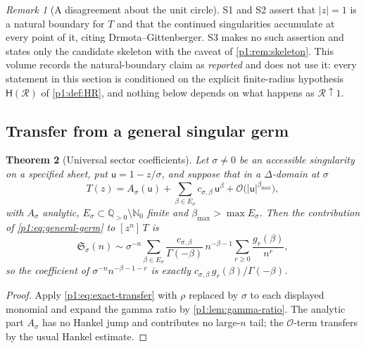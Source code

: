 \documentclass[11pt,a4paper,oneside]{book}
\theoremstyle{plain}
\newtheorem{theorem}{Theorem}[chapter]
\theoremstyle{definition}
\theoremstyle{remark}
\newtheorem{remark}[theorem]{Remark}
\newcommand{\Nat}{\mathbb{N}}
\newcommand{\Rat}{\mathbb{Q}}
\newcommand{\Coef}[1]{[#1]\,}
\newcommand{\bigO}{\mathcal{O}}
\begin{document}
\begin{remark}[A disagreement about the unit circle]
\label{p1:rem:natural-boundary}
\textsf{S1} and \textsf{S2} assert that $|z|=1$ is a natural boundary for $T$ and that the
continued singularities accumulate at every point of it, citing Drmota--Gittenberger.
\textsf{S3} makes no such assertion and states only the candidate skeleton with the caveat of
\cref{p1:rem:skeleton}.  This volume records the natural-boundary claim as \emph{reported} and
does not use it: every statement in this section is conditioned on the explicit finite-radius
hypothesis $\mathsf H(\mathcal R)$ of \cref{p1:def:HR}, and nothing below depends on what
happens as $\mathcal R\uparrow1$.
\end{remark}

\subsection{Transfer from a general singular germ}

\begin{theorem}[Universal sector coefficients]
\label{p1:thm:general-sector}
Let $\sigma\ne0$ be an accessible singularity on a specified sheet, put $\mathsf
u=1-z/\sigma$, and suppose that in a $\Delta$-domain at $\sigma$
\begin{equation}
 T(z)=A_\sigma(\mathsf u)
 +\sum_{\beta\in E_\sigma}c_{\sigma,\beta}\,\mathsf u^{\beta}
 +\bigO\bigl(|\mathsf u|^{\beta_{\max}}\bigr),
 \label{p1:eq:general-germ}
\end{equation}
with $A_\sigma$ analytic, $E_\sigma\subset\Rat_{>0}\setminus\Nat_0$ finite and
$\beta_{\max}>\max E_\sigma$.  Then the contribution of \cref{p1:eq:general-germ} to
$\Coef{z^{n}}T$ is
\begin{equation}
 \boxed{\;
 \mathfrak S_\sigma(n)\sim\sigma^{-n}
 \sum_{\beta\in E_\sigma}\frac{c_{\sigma,\beta}}{\Gamma(-\beta)}
 \,n^{-\beta-1}\sum_{r\ge0}\frac{g_r(\beta)}{n^{r}},\;}
 \label{p1:eq:general-sector}
\end{equation}
so the coefficient of $\sigma^{-n}n^{-\beta-1-r}$ is exactly
$c_{\sigma,\beta}\,g_r(\beta)/\Gamma(-\beta)$.
\end{theorem}

\begin{proof}
Apply \cref{p1:eq:exact-transfer} with $\rho$ replaced by $\sigma$ to each displayed monomial
and expand the gamma ratio by \cref{p1:lem:gamma-ratio}.  The analytic part $A_\sigma$ has no
Hankel jump and contributes no large-$n$ tail; the $\bigO$-term transfers by the usual Hankel
estimate.
\end{proof}
\end{document}
